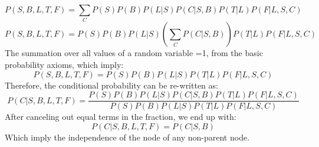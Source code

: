 \documentclass{article}
\begin{document}
\begin{equation}
P(S,B,L,T,F) = \sum_{C} P(S)P(B)P(L|S)P(C|S,B)P(T|L)P(F|L,S,C)
\end{equation}
\begin{equation}
P(S,B,L,T,F) = P(S)P(B)P(L|S)(\sum_{C}P(C|S,B))P(T|L)P(F|L,S,C)
\end{equation}
The summation over all values of a random variable =1, from the basic probability axioms, which imply:
\begin{equation}
P(S,B,L,T,F) = P(S)P(B)P(L|S)P(T|L)P(F|L,S,C)
\end{equation}
Therefore, the conditional probability can be re-written as:
\begin{equation}
P(C|S,B, L, T, F) = \frac{P(S)P(B)P(L|S)P(C|S,B)P(T|L)P(F|L,S,C)}{P(S)P(B)P(L|S)P(T|L)P(F|L,S,C)}
\end{equation}
After canceling out equal terms in the fraction, we end up with:
\begin{equation}
P(C|S,B, L, T, F) = P(C|S,B)
\end{equation}
Which imply the independence of the node of any non-parent node. 
\end{document}
